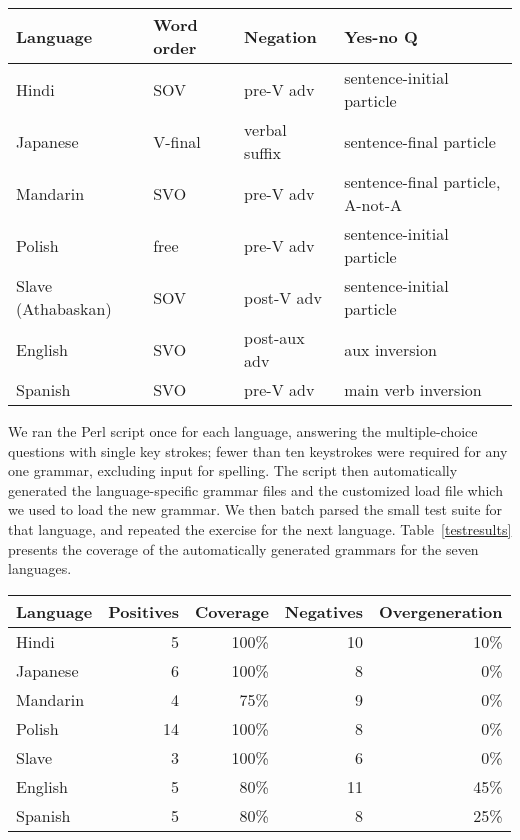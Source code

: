 \begin{table*}[ht]
\begin{center}
\small
\begin{tabular}{llll}
\hline
Language & Word order & Negation & Yes-no Q\footnotemark \\ \hline
Hindi    & SOV        & pre-V adv 	& sentence-initial particle\\
Japanese & V-final    & verbal suffix   & sentence-final particle\\
Mandarin & SVO	      & pre-V adv	& sentence-final particle, A-not-A \\
Polish   & free	      & pre-V adv       & sentence-initial particle  \\
Slave (Athabaskan) & SOV & post-V adv	& sentence-initial particle \\
English  & SVO	      & post-aux adv	& aux inversion \\
Spanish  & SVO	      & pre-V adv	& main verb inversion \\ \hline
\end{tabular}
\end{center}
\caption{Languages used in testing}
\label{testsuitetable}
\end{table*}

\addtocounter{footnote}{-1}

We ran the Perl script once for each language, answering the
multiple-choice questions with single key strokes; fewer than ten
keystrokes were required for any one grammar, excluding input for
spelling.  The script then automatically generated the
language-specific grammar files and the customized load file
which we used to load the new grammar.  We then batch parsed the small
test suite for that language, and repeated the exercise for the next
language.  Table~\ref{testresults} presents the coverage of the
automatically generated grammars for the seven languages.

\begin{table*}[ht]
\begin{center}
\small
\begin{tabular}{lrrrr}
\hline
Language & Positives & Coverage & Negatives & Overgeneration \\ \hline
Hindi    & 5         & 100\% 	& 10 & 10\% \\
Japanese & 6         & 100\%    &  8 & 0\% \\
Mandarin & 4	     &  75\%	&  9 & 0\% \\
Polish   & 14	     & 100\%    &  8 & 0\% \\
Slave    & 3         & 100\%	&  6 & 0\% \\
English  & 5	     & 80\%	& 11 & 45\%\\
Spanish  & 5         & 80\%	& 8  & 25\% \\ \hline
\end{tabular}
\end{center}
\caption{Parsing evaluation results}
\label{testresults}
\end{table*}

